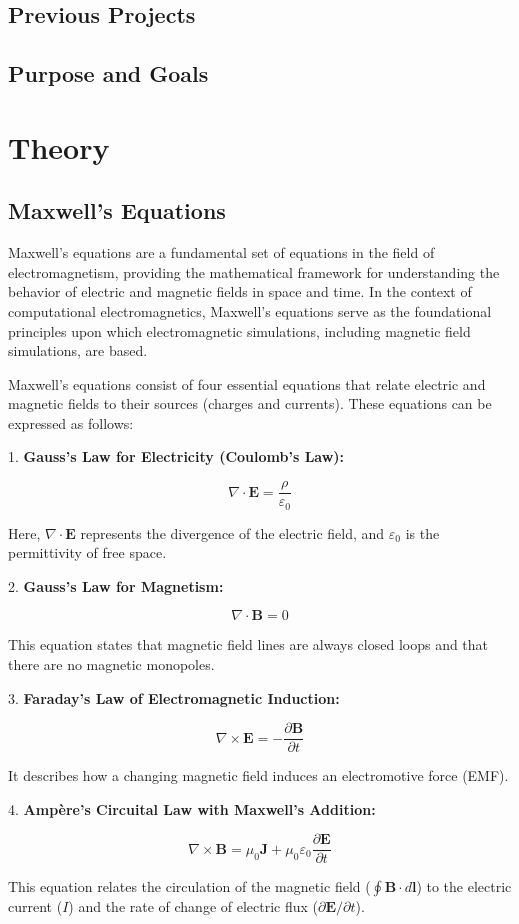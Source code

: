 \documentclass[11pt, a4paper, titlepage]{article}
\begin{document}
\subsection{Previous Projects}
\subsection{Purpose and Goals}
\newpage




\section{Theory}
\subsection{Maxwell's Equations}

Maxwell's equations are a fundamental set of equations in the field of electromagnetism, providing the mathematical framework for understanding the behavior of electric and magnetic fields in space and time. In the context of computational electromagnetics, Maxwell's equations serve as the foundational principles upon which electromagnetic simulations, including magnetic field simulations, are based.


Maxwell's equations consist of four essential equations that relate electric and magnetic fields to their sources (charges and currents). These equations can be expressed as follows:
\begin{center}
	1. \textbf{Gauss's Law for Electricity (Coulomb's Law):}
	
	\[
	\nabla \cdot \mathbf{E} = \frac{\rho}{\varepsilon_0}
	\]
	
	Here, \(\nabla \cdot \mathbf{E}\) represents the divergence of the electric field, and \(\varepsilon_0\) is the permittivity of free space.
\end{center}
\begin{center}
	2. \textbf{Gauss's Law for Magnetism:}
	
	\[
	\nabla \cdot \mathbf{B} = 0
	\]
	
	This equation states that magnetic field lines are always closed loops and that there are no magnetic monopoles.
\end{center}
\begin{center}
	3. \textbf{Faraday's Law of Electromagnetic Induction:}
	
	\[
	\nabla \times \mathbf{E} = -\frac{\partial \mathbf{B}}{\partial t}
	\]
	
	It describes how a changing magnetic field induces an electromotive force (EMF).
\end{center}
\begin{center}
	4. \textbf{Ampère's Circuital Law with Maxwell's Addition:}
	
	\[
	\nabla \times \mathbf{B} = \mu_0 \mathbf{J} + \mu_0 \varepsilon_0 \frac{\partial \mathbf{E}}{\partial t}
	\]
	
	This equation relates the circulation of the magnetic field (\(\oint \mathbf{B} \cdot d\mathbf{l}\)) to the electric current (\(I\)) and the rate of change of electric flux (\(\partial \mathbf{E}/\partial t\)). 
\end{center}
\end{document}
